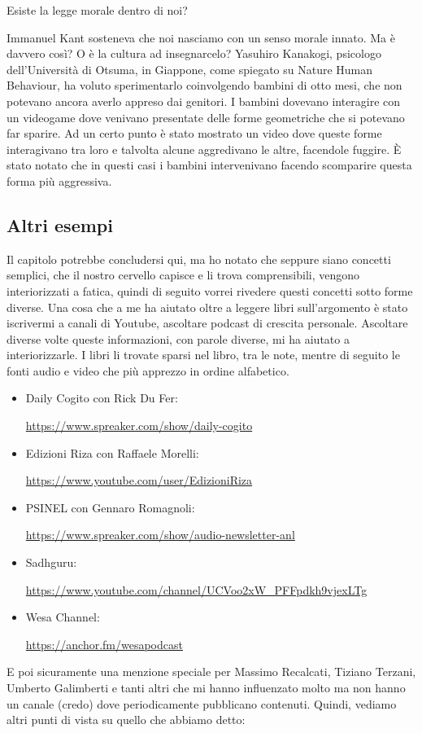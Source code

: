 \documentclass[12pt]{book} %
\begin{document}
\begin{mdframed}[linewidth=1pt]
Esiste la legge morale dentro di noi?

Immanuel Kant sosteneva che noi nasciamo con un senso morale innato. Ma è davvero così? O è la cultura ad insegnarcelo?
Yasuhiro Kanakogi, psicologo dell'Università di Otsuma, in Giappone, come spiegato su Nature Human
Behaviour, ha voluto sperimentarlo coinvolgendo bambini di otto mesi, che
non potevano ancora averlo appreso dai genitori. I bambini dovevano interagire con un videogame dove venivano
presentate delle forme geometriche che si potevano far sparire. Ad un certo punto è stato mostrato un video dove queste
forme interagivano tra loro e talvolta alcune aggredivano le altre, facendole fuggire. È stato notato che in questi
casi i bambini intervenivano facendo scomparire questa forma più aggressiva.
\end{mdframed}

\subsection{Altri esempi}
Il capitolo potrebbe concludersi qui, ma ho notato che seppure siano concetti semplici, che il nostro cervello capisce e
li trova comprensibili, vengono interiorizzati a fatica, quindi di seguito vorrei rivedere questi concetti sotto forme
diverse. Una cosa che a me ha aiutato oltre a leggere libri sull'argomento è stato iscrivermi a
canali di Youtube, ascoltare podcast di crescita personale. Ascoltare diverse volte queste informazioni, con parole
diverse, mi ha aiutato a interiorizzarle. I libri li trovate sparsi nel libro, tra le note, mentre di seguito le fonti
audio e video che più apprezzo in ordine alfabetico.

\begin{itemize}
\item Daily Cogito con Rick Du Fer: \raggedright\url{https://www.spreaker.com/show/daily-cogito} 
\item Edizioni Riza con Raffaele Morelli: \raggedright\url{https://www.youtube.com/user/EdizioniRiza}
\item PSINEL con Gennaro Romagnoli: \raggedright\url{https://www.spreaker.com/show/audio-newsletter-anl} 
\item Sadhguru: \raggedright\url{https://www.youtube.com/channel/UCVoo2xW\_PFFpdkh9vjexLTg} 
\item Wesa Channel: \raggedright\url{https://anchor.fm/wesapodcast} 
\end{itemize}
E poi sicuramente una menzione speciale per Massimo Recalcati, Tiziano Terzani, Umberto Galimberti e tanti altri che mi
hanno influenzato molto ma non hanno un canale (credo) dove periodicamente pubblicano contenuti. Quindi, vediamo altri
punti di vista su quello che abbiamo detto:
\end{document}
